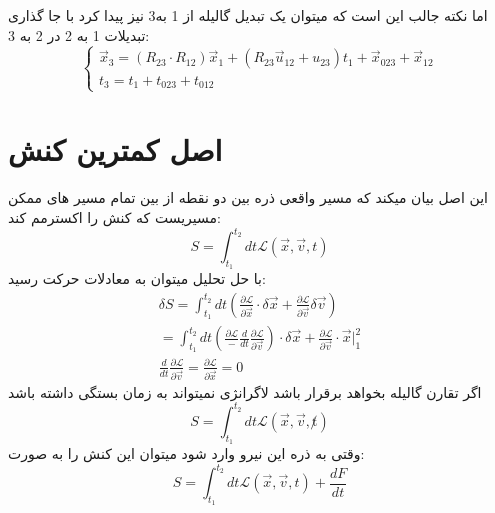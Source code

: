 \documentclass[9pt,a4paper, twocolumn]{article}
\newcommand{\curveL}{\mathcal{L}}
\begin{document}
            اما نکته جالب این است که میتوان یک تبدیل گالیله از 1 به3 نیز پیدا کرد با جا گذاری تبدیلات 1 به 2 در 2 به 3:
            \begin{equation}
                \left\{
                    \begin{matrix}
                        \vec x_3 = (R_{23} \cdot R_{12}) \vec x_1 + (R_{23}\vec u_{12} + u_23) t_1  + \vec x_{023} + \vec x_{12}
                        \\
                        t_3 = t_1 + t_023 + t_{012}
                    \end{matrix}
                \right.
            \end{equation}

        \section{اصل کمترین کنش}
        این اصل بیان میکند که مسیر واقعی ذره بین دو نقطه از بین تمام مسیر های ممکن مسیریست که کنش را  اکسترمم کند:
            \begin{equation}
                S = \int_{t_1}^{t_2}dt \curveL(\vec x, \vec v, t)
            \end{equation}
            با حل تحلیل میتوان به معادلات حرکت رسید:
            \begin{align}
                \delta S = \int_{t_1}^{t_2}dt\left(\frac{\partial \curveL}{\partial \vec x} \cdot \delta \vec x + \frac{\partial \curveL}{\partial \vec v} \delta \vec v\right)\\
                = \int_{t_1}^{t_2}dt\left(\frac{\partial \curveL} - \frac{d}{dt}\frac{\partial \curveL}{\partial \vec v}\right)\cdot \delta \vec x + \frac{\partial \curveL}{\partial \vec v} \cdot \vec x |_1^2\\
                \frac{d}{dt} \frac{\partial \curveL}{\partial \vec v} = \frac{\partial \curveL}{\partial \vec x} = 0
            \end{align}
            اگر تقارن گالیله بخواهد برقرار باشد لاگرانژی نمیتواند به زمان بستگی داشته باشد
            \begin{equation}
                S = \int_{t_1}^{t_2}dt \curveL(\vec x, \vec v, \not t)
            \end{equation}
            وقتی به ذره این نیرو وارد شود میتوان این کنش را به صورت:
                \begin{equation}
                    S = \int_{t_1}^{t_2}dt \curveL(\vec x, \vec v, t) + \frac{d F}{dt} 
                \end{equation}
\end{document}
